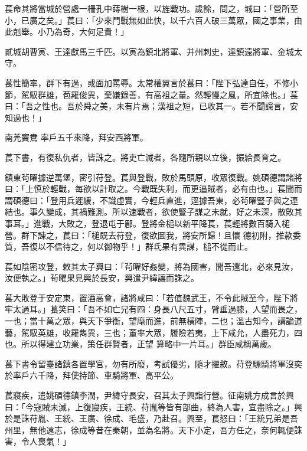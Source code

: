 \begin{pinyinscope}
 萇命其將當城於營處一柵孔中蒔樹一根，以旌戰功。歲餘，問之，城曰：「營所至小，已廣之矣。」萇曰：「少來鬥戰無如此快，以千六百人破三萬眾，國之事業，由此剋舉。小乃為奇，大何足貴！」



 貳城胡曹寅、王達獻馬三千匹。以寅為鎮北將軍、并州刺史，達鎮遠將軍、金城太守。



 萇性簡率，群下有過，或面加罵辱。太常權翼言於萇曰：「陛下弘達自任，不修小節，駕馭群雄，苞羅俊異，棄嫌錄善，有高祖之量。然輕慢之風，所宜除也。」萇曰：「吾之性也。吾於舜之美，未有片焉；漢祖之短，已收其一。若不聞讜言，安知過也！」



 南羌竇鴦
 率戶五千來降，拜安西將軍。



 萇下書，有復私仇者，皆誅之。將吏亡滅者，各隨所親以立後，振給長育之。



 鎮東茍曜據逆萬堡，密引苻登。萇與登戰，敗於馬頭原，收眾復戰。姚碩德謂諸將曰：「上慎於輕戰，每欲以計取之。今戰既失利，而更逼賊者，必有由也。」萇聞而謂碩德曰：「登用兵遲緩，不識虛實，今輕兵直進，逕據吾東，必茍曜豎子與之連結也。事久變成，其禍難測。所以速戰者，欲使豎子謀之未就，好之未深，散敗其事耳。」進戰，大敗之，登退屯于郿。登將金槌以新平降萇，萇輕將數百騎入槌營。群下諫之，萇曰：「槌既去苻登，復欲圖我，將安所歸！且懷
 德初附，推款委質，吾復以不信待之，何以御物乎！」群氐果有異謀，槌不從而止。



 萇如陰密攻登，敕其太子興曰：「茍曜好姦變，將為國害，聞吾還北，必來見汝，汝便執之。」茍曜果見興於長安，興遣尹緯讓而誅之。



 萇大敗登于安定東，置酒高會，諸將咸曰：「若值魏武王，不令此賊至今，陛下將牢太過耳。」萇笑曰：「吾不如亡兄有四：身長八尺五寸，臂垂過膝，人望而畏之，一也；當十萬之眾，與天下爭衡，望麾而進，前無橫陣，二也；溫古知今，講論道藝，駕馭英雄，收羅雋異，三也；董率大眾，履險若夷，上下咸允，人盡死力，四也。所以得建立功業，策任群賢者，正望
 算略中一片耳。」群臣咸稱萬歲。



 萇下書令留臺諸鎮各置學官，勿有所廢，考試優劣，隨才擢敘。苻登驃騎將軍沒奕於率戶六千降，拜使持節、車騎將軍、高平公。



 萇寢疾，遣姚碩德鎮李潤，尹緯守長安，召其太子興詣行營。征南姚方成言於興曰：「今寇賊未滅，上復寢疾，王統、苻胤等皆有部曲，終為人害，宜盡除之。」興於是誅苻胤、王統、王廣、徐成、毛盛，乃赴召。興至，萇怒曰：「王統兄弟是吾州里，無他遠志，徐成等昔在秦朝，並為名將。天下小定，吾方任之，奈何輒便誅害，令人喪氣！」




\end{pinyinscope}
